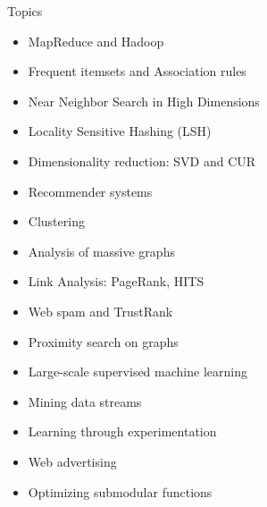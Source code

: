 Topics
\begin{itemize}
\item  MapReduce and Hadoop
\item  Frequent itemsets and Association rules
\item  Near Neighbor Search in High Dimensions
\item  Locality Sensitive Hashing (LSH)
\item  Dimensionality reduction: SVD and CUR
\item  Recommender systems
\item  Clustering
\item  Analysis of massive graphs
\item  Link Analysis: PageRank, HITS
\item  Web spam and TrustRank
\item  Proximity search on graphs
\item  Large-scale supervised machine learning
\item  Mining data streams
\item  Learning through experimentation
\item  Web advertising
\item  Optimizing submodular functions
\end{itemize}

